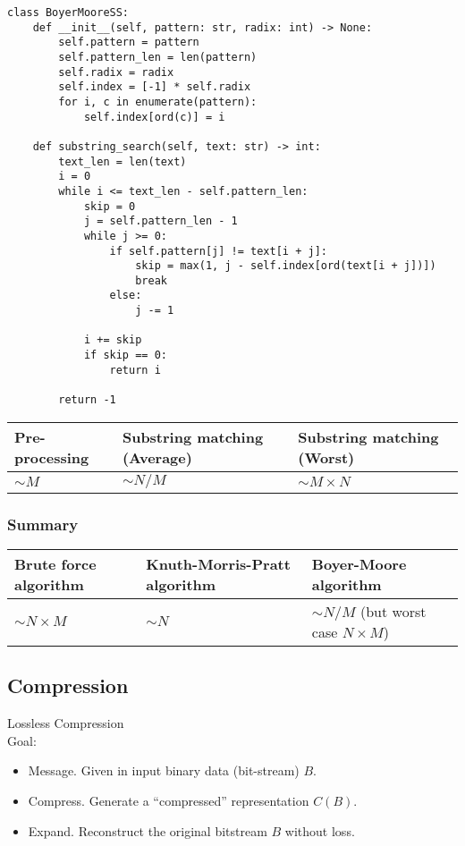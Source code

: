 \documentclass[a4paper]{article}
\begin{document}
\begin{lstlisting}
class BoyerMooreSS:
    def __init__(self, pattern: str, radix: int) -> None:
        self.pattern = pattern
        self.pattern_len = len(pattern)
        self.radix = radix
        self.index = [-1] * self.radix
        for i, c in enumerate(pattern):
            self.index[ord(c)] = i

    def substring_search(self, text: str) -> int:
        text_len = len(text)
        i = 0
        while i <= text_len - self.pattern_len:
            skip = 0
            j = self.pattern_len - 1
            while j >= 0:
                if self.pattern[j] != text[i + j]:
                    skip = max(1, j - self.index[ord(text[i + j])])
                    break
                else:
                    j -= 1

            i += skip
            if skip == 0:
                return i

        return -1
\end{lstlisting}

\begin{spacing}{1.5}
\begin{tabularx}{1\textwidth}{|X|X|X|}
    \hline
    \textbf{Pre-processing} & \textbf{Substring matching (Average)} & \textbf{Substring matching (Worst)}\\
    \hline
    $\sim M$&$\sim N/M$&$\sim M\times N$\\
    \hline
\end{tabularx}
\end{spacing}

\subsubsection*{Summary}
\begin{spacing}{1.5}
\begin{tabularx}{1\textwidth}{|X|X|X|}
    \hline
    \textbf{Brute force algorithm} & \textbf{Knuth-Morris-Pratt algorithm} & \textbf{Boyer-Moore algorithm}\\
    \hline
    $\sim N\times M$&$\sim N$&$\sim N/M$ (but worst case $N\times M$)\\
    \hline
\end{tabularx}
\end{spacing}

\subsection{Compression}
Lossless Compression\\
Goal:
\begin{itemize}
    \item Message. Given in input binary data (bit-stream) $B$.
    \item Compress. Generate a “compressed” representation $C(B)$.
    \item Expand. Reconstruct the original bitstream $B$ without loss.
\end{itemize}
\end{document}
